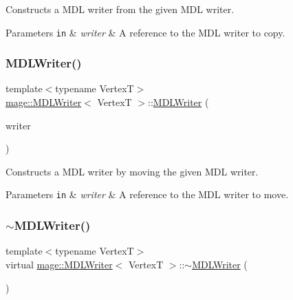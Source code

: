 Constructs a M\+DL writer from the given M\+DL writer.


\begin{DoxyParams}[1]{Parameters}
\mbox{\tt in}  & {\em writer} & A reference to the M\+DL writer to copy. \\
\hline
\end{DoxyParams}
\hypertarget{classmage_1_1_m_d_l_writer_a6eedabcade544cc08747535ad36323c4}{}\label{classmage_1_1_m_d_l_writer_a6eedabcade544cc08747535ad36323c4} 
\subsubsection{\texorpdfstring{M\+D\+L\+Writer()}{MDLWriter()}\hspace{0.1cm}{\footnotesize\ttfamily [3/3]}}
{\footnotesize\ttfamily template$<$typename VertexT$>$ \\
\hyperlink{classmage_1_1_m_d_l_writer}{mage\+::\+M\+D\+L\+Writer}$<$ VertexT $>$\+::\hyperlink{classmage_1_1_m_d_l_writer}{M\+D\+L\+Writer} (\begin{DoxyParamCaption}\item[{\hyperlink{classmage_1_1_m_d_l_writer}{M\+D\+L\+Writer}$<$ VertexT $>$ \&\&}]{writer }\end{DoxyParamCaption})}

Constructs a M\+DL writer by moving the given M\+DL writer.


\begin{DoxyParams}[1]{Parameters}
\mbox{\tt in}  & {\em writer} & A reference to the M\+DL writer to move. \\
\hline
\end{DoxyParams}
\hypertarget{classmage_1_1_m_d_l_writer_a8ec899d031d513eedf3345b78361d0de}{}\label{classmage_1_1_m_d_l_writer_a8ec899d031d513eedf3345b78361d0de} 
\subsubsection{\texorpdfstring{$\sim$\+M\+D\+L\+Writer()}{~MDLWriter()}}
{\footnotesize\ttfamily template$<$typename VertexT$>$ \\
virtual \hyperlink{classmage_1_1_m_d_l_writer}{mage\+::\+M\+D\+L\+Writer}$<$ VertexT $>$\+::$\sim$\hyperlink{classmage_1_1_m_d_l_writer}{M\+D\+L\+Writer} (\begin{DoxyParamCaption}{ }\end{DoxyParamCaption})\hspace{0.3cm}{\ttfamily [virtual]}}

